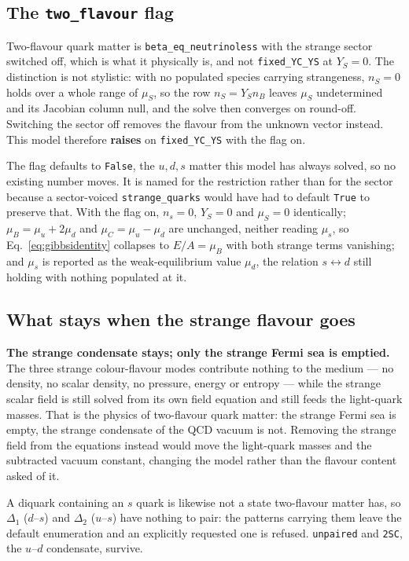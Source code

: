 \documentclass[aps,prc,onecolumn,superscriptaddress,nofootinbib,10pt]{revtex4-2}
\begin{document}
\subsection{The \texttt{two\_flavour} flag}

Two-flavour quark matter is \texttt{beta\_eq\_neutrinoless} with the strange
sector switched off, which is what it physically is, and not
\texttt{fixed\_YC\_YS} at $Y_S = 0$. The distinction is not stylistic: with no
populated species carrying strangeness, $n_S = 0$ holds over a whole range of
$\mu_S$, so the row $n_S = Y_S n_B$ leaves $\mu_S$ undetermined and its
Jacobian column null, and the solve then converges on round-off. Switching the
sector off removes the flavour from the unknown vector instead. This model
therefore \textbf{raises} on \texttt{fixed\_YC\_YS} with the flag on.

The flag defaults to \texttt{False}, the $u,d,s$ matter this model has always
solved, so no existing number moves. It is named for the restriction rather
than for the sector because a sector-voiced \texttt{strange\_quarks} would have
had to default \texttt{True} to preserve that. With the flag on, $n_s = 0$,
$Y_S = 0$ and $\mu_S = 0$ identically; $\mu_B = \mu_u + 2\mu_d$ and
$\mu_C = \mu_u - \mu_d$ are unchanged, neither reading $\mu_s$, so
Eq.~\eqref{eq:gibbsidentity} collapses to $E/A = \mu_B$ with both strange terms
vanishing; and $\mu_s$ is reported as the weak-equilibrium value $\mu_d$, the
relation $s \leftrightarrow d$ still holding with nothing populated at it.

\subsection{What stays when the strange flavour goes}

\textbf{The strange condensate stays; only the strange Fermi sea is emptied.}
The three strange colour-flavour modes contribute nothing to the medium --- no
density, no scalar density, no pressure, energy or entropy --- while the
strange scalar field is still solved from its own field equation and still
feeds the light-quark masses. That is the physics of two-flavour quark matter:
the strange Fermi sea is empty, the strange condensate of the QCD vacuum is
not. Removing the strange field from the equations instead would move the
light-quark masses and the subtracted vacuum constant, changing the model
rather than the flavour content asked of it.

A diquark containing an $s$ quark is likewise not a state two-flavour matter
has, so $\Delta_1$ ($d$--$s$) and $\Delta_2$ ($u$--$s$) have nothing to pair:
the patterns carrying them leave the default enumeration and an explicitly
requested one is refused. \texttt{unpaired} and \texttt{2SC}, the $u$--$d$
condensate, survive.
\end{document}
